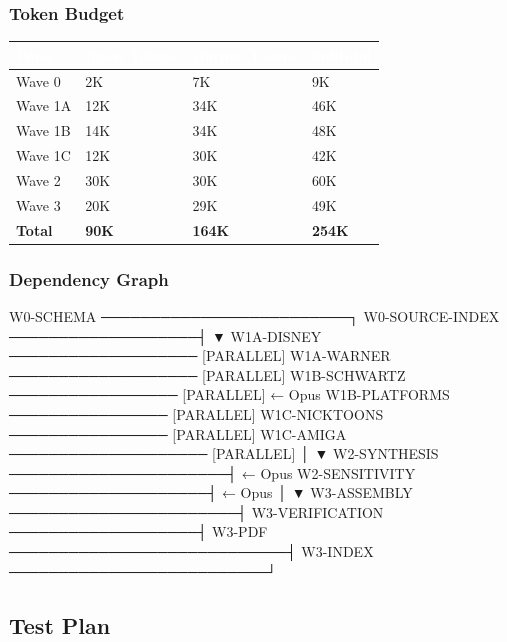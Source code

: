 \documentclass[11pt,letterpaper]{article}
\newcommand{\tableheader}[1]{\textbf{\sffamily\textcolor{white}{#1}}}
\begin{document}
\subsubsection{Token Budget}

\begin{center}
\begin{tabularx}{\textwidth}{L{3.5cm}C{2cm}C{2cm}C{2cm}}
\toprule
{}
\tableheader{Wave} & \tableheader{Input Tokens} & \tableheader{Output Tokens} & \tableheader{Subtotal} \\
\midrule
Wave 0 & 2K & 7K & 9K \\
Wave 1A & 12K & 34K & 46K \\
Wave 1B & 14K & 34K & 48K \\
Wave 1C & 12K & 30K & 42K \\
Wave 2 & 30K & 30K & 60K \\
Wave 3 & 20K & 29K & 49K \\
\midrule
\textbf{Total} & \textbf{90K} & \textbf{164K} & \textbf{254K} \\
\bottomrule
\end{tabularx}
\end{center}

\subsubsection{Dependency Graph}

\begin{asciibox}
W0-SCHEMA ─────────────────────────┐
W0-SOURCE-INDEX ───────────────────┤
                                   ▼
W1A-DISNEY ─────────────────── [PARALLEL]
W1A-WARNER ─────────────────── [PARALLEL]
W1B-SCHWARTZ ───────────────── [PARALLEL]  ← Opus
W1B-PLATFORMS ──────────────── [PARALLEL]
W1C-NICKTOONS ──────────────── [PARALLEL]
W1C-AMIGA ──────────────────── [PARALLEL]
                                   │
                                   ▼
W2-SYNTHESIS ──────────────────────┤  ← Opus
W2-SENSITIVITY ────────────────────┤  ← Opus
                                   │
                                   ▼
W3-ASSEMBLY ───────────────────────┤
W3-VERIFICATION ───────────────────┤
W3-PDF ────────────────────────────┤
W3-INDEX ──────────────────────────┘
\end{asciibox}

\subsection{Test Plan}
\end{document}
